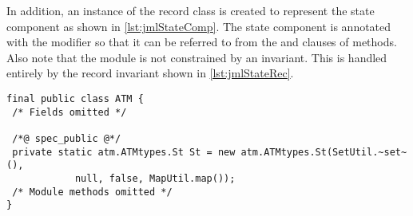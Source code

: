 In addition, an instance of the record class is created to represent
the state component as shown in \autoref{lst:jmlStateComp}. The state
component is annotated with the  modifier so that it
can be referred to from the  and  clauses of
 methods. Also note that the module is not constrained by
an invariant. This is handled entirely by the record invariant shown
in \autoref{lst:jmlStateRec}.

\begin{lstlisting}[style=customJml,caption={The state component in the
\texttt{ATM} module.},label={lst:jmlStateComp}]
final public class ATM {
 /* Fields omitted */

 /*@ spec_public @*/
 private static atm.ATMtypes.St St = new atm.ATMtypes.St(SetUtil.~set~(),
            null, false, MapUtil.map());
 /* Module methods omitted */ 
}
\end{lstlisting}



